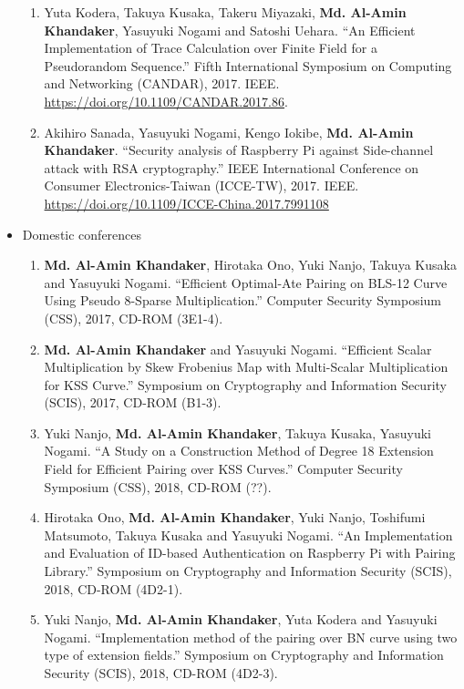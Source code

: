 \begin{itemize}
\begin{enumerate}
	\item	Yuta Kodera, Takuya Kusaka, Takeru Miyazaki, \textbf{Md. Al-Amin Khandaker}, Yasuyuki Nogami and  Satoshi Uehara. ``An Efficient Implementation of Trace Calculation over Finite Field for a Pseudorandom Sequence.'' Fifth International Symposium on Computing and Networking (CANDAR), 2017. IEEE. \url{https://doi.org/10.1109/CANDAR.2017.86}.
	
	\item Akihiro Sanada, Yasuyuki Nogami, Kengo Iokibe, \textbf{Md. Al-Amin Khandaker}. ``Security analysis of Raspberry Pi against Side-channel attack with RSA cryptography.'' IEEE International Conference on Consumer Electronics-Taiwan (ICCE-TW), 2017. IEEE.  \url{https://doi.org/10.1109/ICCE-China.2017.7991108} 
	
\end{enumerate}
\vspace{10mm}
\large
\item Domestic conferences
\begin{enumerate}
	
	\item \textbf{Md. Al-Amin Khandaker}, Hirotaka Ono, Yuki Nanjo, Takuya Kusaka and Yasuyuki Nogami. ``Efficient Optimal-Ate Pairing on BLS-12 Curve Using Pseudo 8-Sparse Multiplication.'' Computer Security Symposium  (CSS),  2017, CD-ROM (3E1-4). 
	
	\item \textbf{Md. Al-Amin Khandaker} and Yasuyuki Nogami. ``Efficient Scalar Multiplication by Skew Frobenius Map with Multi-Scalar Multiplication for KSS Curve.'' Symposium on Cryptography and Information Security (SCIS),  2017, CD-ROM (B1-3). 
	
	\item Yuki Nanjo,  \textbf{Md. Al-Amin Khandaker}, Takuya Kusaka, Yasuyuki Nogami. ``A Study on a Construction Method of Degree 18 Extension Field for Efficient Pairing over KSS Curves.''  Computer Security Symposium  (CSS),  2018, CD-ROM (??). 
	
	\item  Hirotaka Ono, \textbf{Md. Al-Amin Khandaker}, Yuki Nanjo, Toshifumi Matsumoto, Takuya Kusaka and Yasuyuki Nogami. ``An Implementation and Evaluation of ID-based Authentication on Raspberry Pi with Pairing Library.'' Symposium on Cryptography and Information Security (SCIS),  2018, CD-ROM (4D2-1).  
	
	\item Yuki Nanjo, \textbf{Md. Al-Amin Khandaker}, Yuta Kodera and Yasuyuki Nogami. ``Implementation method of the pairing over BN curve using two type of extension fields.'' Symposium on Cryptography and Information Security (SCIS),  2018, CD-ROM (4D2-3).
	

\end{enumerate}
\end{itemize}
